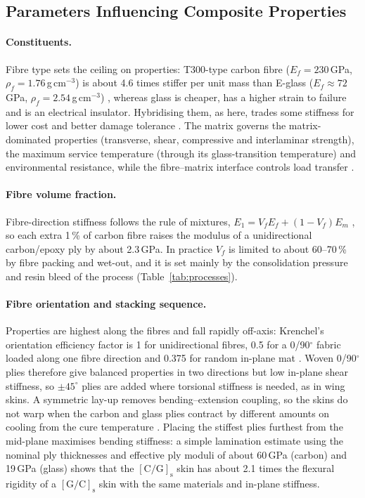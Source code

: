 \documentclass[11pt,a4paper]{article}
\newenvironment{addedblock}{\color{addgreen}}{}
\newenvironment{addedblock}{}{}
\begin{document}
\begin{addedblock}
\subsection{Parameters Influencing Composite Properties}

\paragraph{Constituents.} Fibre type sets the ceiling on properties:
T300-type carbon fibre ($E_f=230$\,GPa, $\rho_f=1.76$\,g\,cm$^{-3}$) is
about 4.6 times stiffer per unit mass than E-glass ($E_f\approx72$\,GPa,
$\rho_f=2.54$\,g\,cm$^{-3}$) \citep{toray_t300,mallick2007}, whereas
glass is cheaper, has a higher strain to failure and is an electrical
insulator. Hybridising them, as here, trades some stiffness for lower
cost and better damage tolerance \citep{swolfs2014}. The matrix
governs the matrix-dominated properties (transverse, shear,
compressive and interlaminar strength), the maximum service
temperature (through its glass-transition temperature) and
environmental resistance, while the fibre--matrix interface controls
load transfer \citep{mallick2007}.

\paragraph{Fibre volume fraction.} Fibre-direction stiffness follows
the rule of mixtures, $E_1 = V_f E_f + (1-V_f)E_m$
\citep{mallick2007}, so each extra 1\,\% of carbon fibre raises the
modulus of a unidirectional carbon/epoxy ply by about 2.3\,GPa. In
practice $V_f$ is limited to about 60--70\,\% by fibre packing and
wet-out, and it is set mainly by the consolidation pressure and resin
bleed of the process (Table~\ref{tab:processes}).

\paragraph{Fibre orientation and stacking sequence.} Properties are
highest along the fibres and fall rapidly off-axis: Krenchel's
orientation efficiency factor is 1 for unidirectional fibres, 0.5 for
a 0/90$^\circ$ fabric loaded along one fibre direction and 0.375 for
random in-plane mat \citep{krenchel1964}. Woven 0/90$^\circ$ plies
therefore give balanced properties in two directions but low in-plane
shear stiffness, so $\pm45^\circ$ plies are added where torsional
stiffness is needed, as in wing skins. A symmetric lay-up removes
bending--extension coupling, so the skins do not warp when the carbon
and glass plies contract by different amounts on cooling from the cure
temperature \citep{mallick2007}. Placing the stiffest plies furthest
from the mid-plane maximises bending stiffness: a simple lamination
estimate using the nominal ply thicknesses and effective ply moduli of
about 60\,GPa (carbon) and 19\,GPa (glass) shows that the
$[\mathrm{C}/\mathrm{G}]_\mathrm{s}$ skin has about 2.1 times the
flexural rigidity of a $[\mathrm{G}/\mathrm{C}]_\mathrm{s}$ skin with
the same materials and in-plane stiffness.


\end{addedblock}
\end{document}
